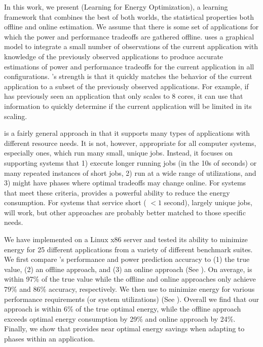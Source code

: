 In this work, we present \SYSTEMLEO{} (Learning for Energy
Optimization), a learning framework that combines the best of both
worlds, \ie the statistical properties both offline and online
estimation.  We assume that there is some set of applications for
which the power and performance tradeoffs are gathered offline.
\SYSTEMLEO{} uses a graphical model to integrate a small number of
observations of the current application with knowledge of the
previously observed applications to produce accurate estimations of
power and performance tradeoffs for the current application in all
configurations.  \SYSTEMLEO{}'s strength is that it quickly matches the
behavior of the current application to a subset of the previously
observed applications.  For example, if \SYSTEMLEO{} has previously seen
an application that only scales to 8 cores, it can use that
information to quickly determine if the current application will be
limited in its scaling.


\SYSTEMLEO{} is a fairly general approach in that it supports many types
of applications with different resource needs.  It is not, however,
appropriate for all computer systems, especially ones, which run many
small, unique jobs.  Instead, it focuses on supporting systems that 1)
execute longer running jobs (in the 10s of seconds) or many repeated
instances of short jobs, 2) run at a wide range of utilizations, and
3) might have phases where optimal tradeoffs may change online.  For
systems that meet these criteria, \SYSTEMLEO{} provides a powerful
ability to reduce the energy consumption.  For systems that service
short ( $< 1$ second), largely unique jobs, \SYSTEMLEO{} will work, but
other approaches are probably better matched to those specific needs.

We have implemented \SYSTEMLEO{} on a Linux x86 server and tested its
ability to minimize energy for 25 different applications from a
variety of different benchmark suites.  We first compare \SYSTEMLEO{}'s
performance and power prediction accuracy to (1) the true value, (2)
an offline approach, and (3) an online approach (See
).  On average, \SYSTEMLEO{} is within 97\% of the true
value while the offline and online approaches only achieve 79\% and
86\% accuracy, respectively.  We then use \SYSTEMLEO{} to minimize energy
for various performance requirements (or system utilizations) (See
).  Overall we find that our approach is
within 6\% of the true optimal energy, while the offline approach
exceeds optimal energy consumption by 29\% and online approach by
24\%.  Finally, we show that \SYSTEMLEO{} provides near optimal energy
savings when adapting to phases within an application.

